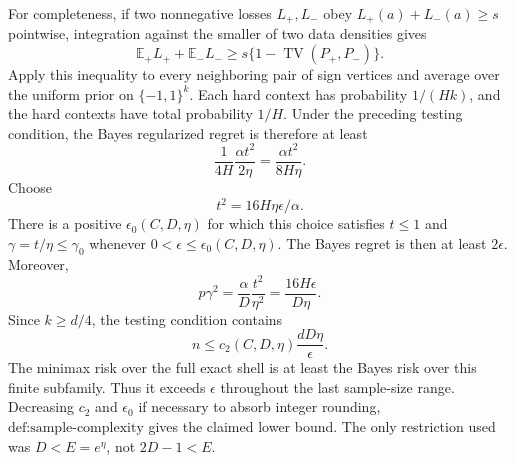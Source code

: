 For completeness, if two nonnegative losses \(L_+,L_-\) obey \(L_+(a)+L_-(a)\ge s\) pointwise, integration against the smaller of two data densities gives
\[
\mathbb E_+L_++\mathbb E_-L_-
\ge s\{1-\operatorname{TV}(P_+,P_-)\}.
\]
Apply this inequality to every neighboring pair of sign vertices and average over the uniform prior on \(\{-1,1\}^k\). Each hard context has probability \(1/(Hk)\), and the hard contexts have total probability \(1/H\). Under the preceding testing condition, the Bayes regularized regret is therefore at least
\[
\frac{1}{4H}\frac{\alpha t^2}{2\eta}
=\frac{\alpha t^2}{8H\eta}.
\]
Choose
\[
t^2=16H\eta\epsilon/\alpha.
\]
There is a positive \(\epsilon_0(C,D,\eta)\) for which this choice satisfies \(t\le1\) and \(\gamma=t/\eta\le\gamma_0\) whenever \(0<\epsilon\le\epsilon_0(C,D,\eta)\). The Bayes regret is then at least \(2\epsilon\). Moreover,
\[
p\gamma^2=\frac{\alpha}{D}\frac{t^2}{\eta^2}
=\frac{16H\epsilon}{D\eta}.
\]
Since \(k\ge d/4\), the testing condition contains
\[
n\le c_2(C,D,\eta)\frac{dD\eta}{\epsilon}.
\]
The minimax risk over the full exact shell is at least the Bayes risk over this finite subfamily. Thus it exceeds \(\epsilon\) throughout the last sample-size range. Decreasing \(c_2\) and \(\epsilon_0\) if necessary to absorb integer rounding, \(\text{def:sample-complexity}\) gives the claimed lower bound. The only restriction used was \(D<E=e^\eta\), not \(2D-1<E\).